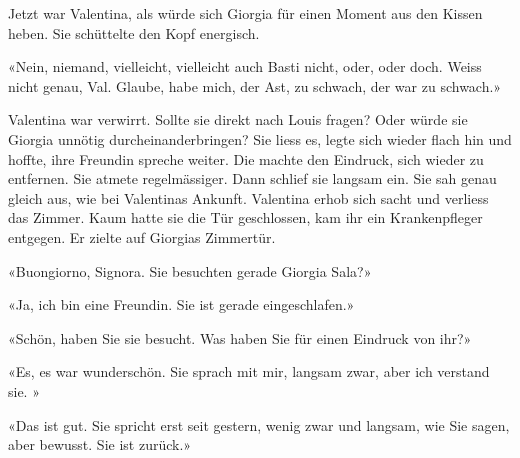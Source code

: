 Jetzt war Valentina, als würde sich Giorgia für einen Moment aus den
Kissen heben.
Sie schüttelte den Kopf energisch.

«Nein, niemand, vielleicht, vielleicht auch Basti nicht, oder, oder
doch. Weiss nicht genau, Val. Glaube, habe mich, der Ast, zu schwach,
der war zu schwach.»

Valentina war verwirrt. Sollte sie direkt nach Louis fragen? 
Oder würde sie Giorgia unnötig durcheinanderbringen? Sie liess es, legte sich
wieder flach hin und hoffte, ihre Freundin spreche weiter. Die machte
den Eindruck, sich wieder zu entfernen. Sie atmete regelmässiger.
Dann schlief sie langsam ein. Sie sah genau gleich aus, wie bei
Valentinas Ankunft.
Valentina erhob sich sacht und verliess das Zimmer. Kaum hatte sie
die Tür geschlossen, kam ihr ein Krankenpfleger entgegen. Er zielte auf
Giorgias Zimmertür.

«Buongiorno, Signora. Sie besuchten gerade Giorgia Sala?»

«Ja, ich bin eine Freundin. Sie ist gerade eingeschlafen.»

«Schön, haben Sie sie besucht. Was haben Sie für einen Eindruck von
ihr?»

«Es, es war wunderschön. Sie sprach mit mir, langsam zwar, aber ich verstand sie. »

«Das ist gut. Sie spricht erst seit gestern, wenig zwar und langsam, wie Sie sagen, aber bewusst.
Sie ist zurück.»


